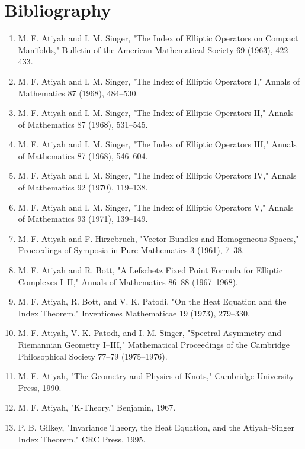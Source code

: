 \section*{Bibliography}

\begin{enumerate}
\item M. F. Atiyah and I. M. Singer, "The Index of Elliptic Operators on Compact Manifolds," Bulletin of the American Mathematical Society 69 (1963), 422--433.
\item M. F. Atiyah and I. M. Singer, "The Index of Elliptic Operators I," Annals of Mathematics 87 (1968), 484--530.
\item M. F. Atiyah and I. M. Singer, "The Index of Elliptic Operators II," Annals of Mathematics 87 (1968), 531--545.
\item M. F. Atiyah and I. M. Singer, "The Index of Elliptic Operators III," Annals of Mathematics 87 (1968), 546--604.
\item M. F. Atiyah and I. M. Singer, "The Index of Elliptic Operators IV," Annals of Mathematics 92 (1970), 119--138.
\item M. F. Atiyah and I. M. Singer, "The Index of Elliptic Operators V," Annals of Mathematics 93 (1971), 139--149.
\item M. F. Atiyah and F. Hirzebruch, "Vector Bundles and Homogeneous Spaces," Proceedings of Symposia in Pure Mathematics 3 (1961), 7--38.
\item M. F. Atiyah and R. Bott, "A Lefschetz Fixed Point Formula for Elliptic Complexes I--II," Annals of Mathematics 86--88 (1967--1968).
\item M. F. Atiyah, R. Bott, and V. K. Patodi, "On the Heat Equation and the Index Theorem," Inventiones Mathematicae 19 (1973), 279--330.
\item M. F. Atiyah, V. K. Patodi, and I. M. Singer, "Spectral Asymmetry and Riemannian Geometry I--III," Mathematical Proceedings of the Cambridge Philosophical Society 77--79 (1975--1976).
\item M. F. Atiyah, "The Geometry and Physics of Knots," Cambridge University Press, 1990.
\item M. F. Atiyah, "K-Theory," Benjamin, 1967.
\item P. B. Gilkey, "Invariance Theory, the Heat Equation, and the Atiyah--Singer Index Theorem," CRC Press, 1995.
\end{enumerate}
